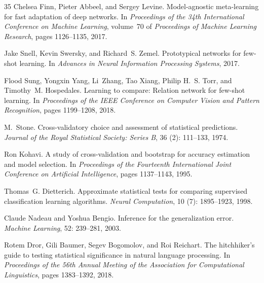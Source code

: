 \documentclass[12pt]{article}
\begin{document}
\begin{thebibliography}{35}
Chelsea Finn, Pieter Abbeel, and Sergey Levine.
\newblock Model-agnostic meta-learning for fast adaptation of deep networks.
\newblock In \emph{Proceedings of the 34th International Conference on Machine
  Learning}, volume~70 of \emph{Proceedings of Machine Learning Research}, pages
  1126--1135, 2017.

Jake Snell, Kevin Swersky, and Richard~S. Zemel.
\newblock Prototypical networks for few-shot learning.
\newblock In \emph{Advances in Neural Information Processing Systems}, 2017.

Flood Sung, Yongxin Yang, Li~Zhang, Tao Xiang, Philip H.~S. Torr, and
  Timothy~M. Hospedales.
\newblock Learning to compare: Relation network for few-shot learning.
\newblock In \emph{Proceedings of the IEEE Conference on Computer Vision and
  Pattern Recognition}, pages 1199--1208, 2018.

M.~Stone.
\newblock Cross-validatory choice and assessment of statistical predictions.
\newblock \emph{Journal of the Royal Statistical Society: Series B},
  36 (2): 111--133, 1974.

Ron Kohavi.
\newblock A study of cross-validation and bootstrap for accuracy estimation and
  model selection.
\newblock In \emph{Proceedings of the Fourteenth International Joint Conference
  on Artificial Intelligence}, pages 1137--1143, 1995.

Thomas~G. Dietterich.
\newblock Approximate statistical tests for comparing supervised classification
  learning algorithms.
\newblock \emph{Neural Computation}, 10 (7): 1895--1923,
  1998.

Claude Nadeau and Yoshua Bengio.
\newblock Inference for the generalization error.
\newblock \emph{Machine Learning}, 52: 239--281, 2003.

Rotem Dror, Gili Baumer, Segev Bogomolov, and Roi Reichart.
\newblock The hitchhiker's guide to testing statistical significance in natural
  language processing.
\newblock In \emph{Proceedings of the 56th Annual Meeting of the Association
  for Computational Linguistics}, pages 1383--1392, 2018.


\end{thebibliography}
\end{document}
